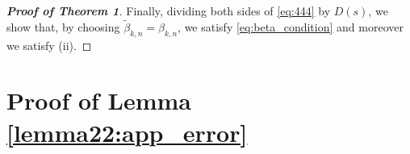 \documentclass[lettersize,journal]{IEEEtran}
\newcommand*{\QEDA}{\hfill \ensuremath{\square}}
\newtheorem{lemma}{Lemma}
\begin{document}
\begin{appendices}
\begin{proof}[\textbf{Proof of Theorem 1}]
Finally, dividing both sides of \eqref{eq:444} by $D(s)$, we show that, by choosing $\widetilde{\beta}_{k,n}=\beta_{k,n}$, we satisfy \eqref{eq:beta_condition} and moreover we satisfy (ii).


\end{proof}
\section{Proof of Lemma \ref{lemma22:app_error}}
\label{sec:approximation}



\end{appendices}
\end{document}

